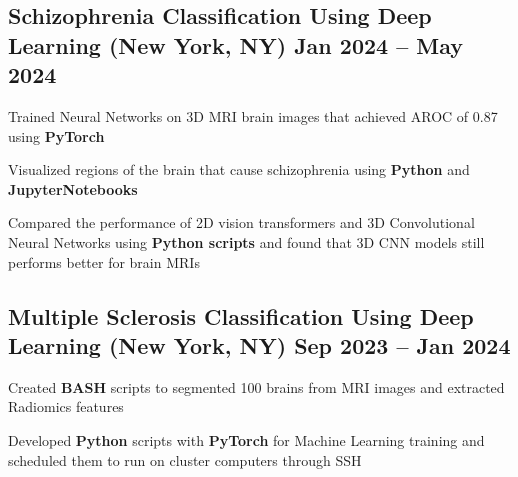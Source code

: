 \documentclass[a4paper,14pt]{article}
\begin{document}
\subsection{\texorpdfstring{Schizophrenia Classification Using Deep Learning \hfill \textnormal{(New York, NY)} Jan 2024 -- May 2024}{Schizophrenia Classification Using Deep Learning (New York, NY) Jan 2024 -- May 2024}}
\begin{zitemize}
    \item Trained Neural Networks on 3D MRI brain images that achieved AROC of 0.87 using \textbf{PyTorch}
\item Visualized regions of the brain that cause schizophrenia using \textbf{Python} and \textbf{JupyterNotebooks}
\item Compared the performance of 2D vision transformers and 3D Convolutional Neural Networks using \textbf{Python scripts} and found that 3D CNN models still performs better for brain MRIs
\end{zitemize}

\subsection{\texorpdfstring{Multiple Sclerosis Classification Using Deep Learning	\hfill \textnormal{(New York, NY)} Sep 2023 -- Jan 2024}{Multiple Sclerosis Classification Using Deep Learning \textnormal{(New York, NY)} Sep 2023 -- Jan 2024}}
\begin{zitemize}
\item Created \textbf{BASH} scripts to segmented 100 brains from MRI images and extracted Radiomics features 
\item Developed \textbf{Python} scripts with \textbf{PyTorch} for Machine Learning training and scheduled them to run on cluster computers through SSH 
\end{zitemize}
\end{document}
